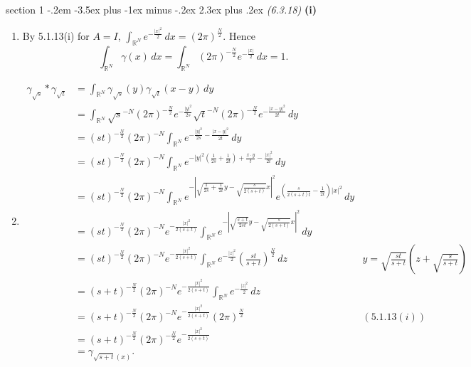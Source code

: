 \documentclass[12pt]{article}
\makeatletter
\theoremstyle{norm}
\newcommand{\R}[0]{\mathbb{R}}
\newcommand{\rc}[1]{\frac{1}{#1}}
\newcommand{\ga}[0]{\gamma}
\newcommand{\Ga}[0]{\Gamma}
\newcommand{\ab}[1]{\left| {#1} \right|}
\newcommand{\pa}[1]{\left( {#1} \right)}
\newcommand{\subprob}[1]{\noindent\textbf{#1}\\}
\newcommand{\pf}[2]{\pa{\frac{#1}{#2}}}
\newcommand{\iy}[0]{\infty}
\newcommand{\sr}[2]{\sqrt{\frac{#1}{#2}}}
\newenvironment{problem}{\@startsection
       {section}
       {1}
       {-.2em}
       {-3.5ex plus -1ex minus -.2ex}
       {2.3ex plus .2ex}
       {\pagebreak[3]%
       \large\bf\noindent{Problem }
       }
       }
       {%
       }
\makeatother
\begin{document}
\begin{problem}{\it (6.3.18)}
\subprob{(i)}
\begin{enumerate}
\item By 5.1.13(i) for $A=I$, $\int_{\R^N} e^{-\frac{|x|^2}{2}}\,dx=(2\pi)^{\frac N2}$. Hence
\[
\int_{\R^N} \ga(x)\,dx=\int_{\R^N}(2\pi)^{-\frac{N}{2}}e^{-\frac{|x|}2}\,dx=1.
\]
\item
\begin{align*}
\ga_{\sqrt s}*\ga_{\sqrt t}&=\int_{\R^N} \ga_{\sqrt s}(y)\ga_{\sqrt t}(x-y)\,dy\\%
&=\int_{\R^N} \sqrt{s}^{-N} (2\pi)^{-\frac N2} e^{-\frac{|y|^2}{2s}}\sqrt{t}^{-N} (2\pi)^{-\frac N2} e^{-\frac{|x-y|^2}{2t}}\,dy\\%
&=(st)^{-\frac N2}(2\pi)^{-N}\int_{\R^N} e^{-\frac{|y|^2}{2s}-\frac{|x-y|^2}{2t}}\,dy\\%
&=(st)^{-\frac N2}(2\pi)^{-N}\int_{\R^N} e^{-|y|^2\pa{\rc{2s}+\rc{2t}}+\frac{x\cdot y}{t}-\frac{|x|^2}{2t}}\,dy\\%
&=(st)^{-\frac N2}(2\pi)^{-N}\int_{\R^N} e^{-\ab{\sqrt{\rc{2s}+\rc{2t}}y-\sqrt{\frac{s}{2(s+t)}}x}^2}e^{\pa{\frac{s}{2(s+t)t}-\rc{2t}}|x|^2}\,dy\\%
&=(st)^{-\frac N2}(2\pi)^{-N}e^{-\frac{|x|^2}{2(s+t)}}\int_{\R^N} e^{-\ab{\sqrt{\frac{s+t}{2st}}y-\sqrt{\frac{s}{2(s+t)}}x}^2}\,dy\\%
&=(st)^{-\frac N2}(2\pi)^{-N}e^{-\frac{|x|^2}{2(s+t)}}\int_{\R^N} e^{-\frac{|z|^2}2}\pf{st}{s+t}^{\frac N2}\,dz&y=\sr{st}{s+t}\pa{z+\sr{s}{s+t}}\\%
&=(s+t)^{-\frac N2}(2\pi)^{-N}e^{-\frac{|x|^2}{2(s+t)}}\int_{\R^N} e^{-\frac{|z|^2}2}\,dz\\
&=(s+t)^{-\frac N2}(2\pi)^{-N}e^{-\frac{|x|^2}{2(s+t)}}(2\pi)^{\frac N2}&(5.1.13(i))\\
&=(s+t)^{-\frac N2}(2\pi)^{-\frac N2}e^{-\frac{|x|^2}{2(s+t)}}\\
&=\ga_{\sqrt{s+t}(x)}.
\end{align*}
\end{enumerate}


\end{problem}
\end{document}
